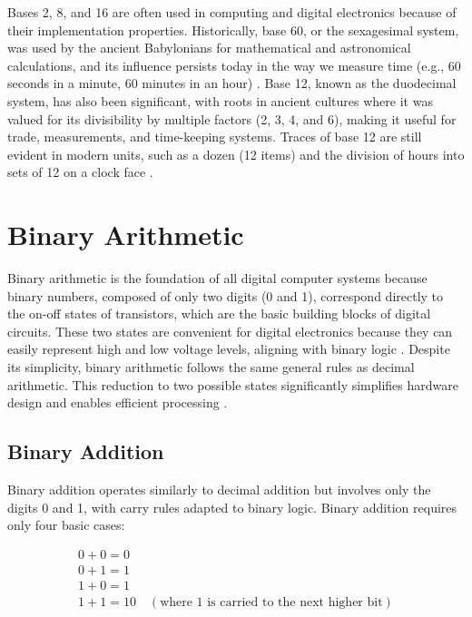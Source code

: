 Bases 2, 8, and 16 are often used in computing and digital electronics because of their implementation properties. Historically, base 60, or the sexagesimal system, was used by the ancient Babylonians for mathematical and astronomical calculations, and its influence persists today in the way we measure time (e.g., 60 seconds in a minute, 60 minutes in an hour) \cite{robson2008}. Base 12, known as the duodecimal system, has also been significant, with roots in ancient cultures where it was valued for its divisibility by multiple factors (2, 3, 4, and 6), making it useful for trade, measurements, and time-keeping systems. Traces of base 12 are still evident in modern units, such as a dozen (12 items) and the division of hours into sets of 12 on a clock face \cite{ifrah2000}.


\section{Binary Arithmetic}
Binary arithmetic is the foundation of all digital computer systems because binary numbers, composed of only two digits (0 and 1), correspond directly to the on-off states of transistors, which are the basic building blocks of digital circuits. These two states are convenient for digital electronics because they can easily represent high and low voltage levels, aligning with binary logic \cite{knuth1997}. Despite its simplicity, binary arithmetic follows the same general rules as decimal arithmetic. This reduction to two possible states significantly simplifies hardware design and enables efficient processing \cite{rosen2018}.

\subsection{Binary Addition}
Binary addition operates similarly to decimal addition but involves only the digits 0 and 1, with carry rules adapted to binary logic. Binary addition requires only four basic cases:

\[
\begin{array}{l}
    0 + 0 = 0 \\
    0 + 1 = 1 \\
    1 + 0 = 1 \\
    1 + 1 = 10 \quad (\text{where 1 is carried to the next higher bit})
\end{array}
\]

